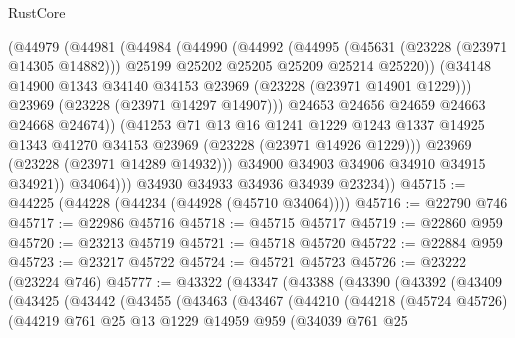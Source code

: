 \begin{lexlean}{RustCore}
\begin{coremodule}
                  (@44979
                    (@44981
                      (@44984
                        (@44990
                          (@44992
                            (@44995
                              (@45631 (@23228 (@23971 @14305 @14882)))
                              @25199
                              @25202
                              @25205
                              @25209
                              @25214
                              @25220))
                          (@34148 @14900 @1343 @34140 @34153 @23969 (@23228 (@23971 @14901 @1229)))
                          @23969
                          (@23228 (@23971 @14297 @14907)))
                        @24653
                        @24656
                        @24659
                        @24663
                        @24668
                        @24674))
                    (@41253
                      @71
                      @13
                      @16
                      @1241
                      @1229
                      @1243
                      @1337
                      @14925
                      @1343
                      @41270
                      @34153
                      @23969
                      (@23228 (@23971 @14926 @1229)))
                    @23969
                    (@23228 (@23971 @14289 @14932)))
                  @34900
                  @34903
                  @34906
                  @34910
                  @34915
                  @34921))
              @34064)))
        @34930
        @34933
        @34936
        @34939
        @23234))
@45715 := @44225 (@44228 (@44234 (@44928 (@45710 @34064))))
@45716 := @22790 @746
@45717 := @22986 @45716
@45718 := @45715 @45717
@45719 := @22860 @959
@45720 := @23213 @45719
@45721 := @45718 @45720
@45722 := @22884 @959
@45723 := @23217 @45722
@45724 := @45721 @45723
@45726 := @23222 (@23224 @746)
@45777 := @43322
    (@43347
      (@43388
        (@43390
          (@43392
            (@43409
              (@43425
                (@43442
                  (@43455
                    (@43463
                      (@43467
                        (@44210
                          (@44218
                            (@45724 @45726)
                            (@44219
                              @761
                              @25
                              @13
                              @1229
                              @14959
                              @959
                              (@34039
                                @761
                                @25

\end{coremodule}
\end{lexlean}
